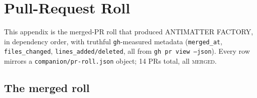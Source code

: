 \section{Pull-Request Roll}
\label{app:pr-roll}

This appendix is the merged-PR roll that produced ANTIMATTER FACTORY, in
dependency order, with truthful \texttt{gh}-measured metadata
(\texttt{merged\_at}, \texttt{files\_changed}, \texttt{lines\_added/deleted},
all from \texttt{gh pr view --json}). Every row mirrors a
\texttt{companion/pr-roll.json} object; 14 PRs total, all \textsc{merged}.

\subsection{The merged roll}
\label{app:pr-table}

